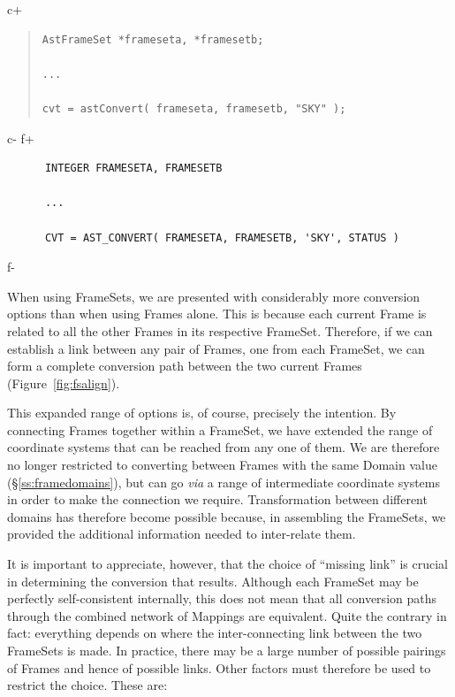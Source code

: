 \documentclass[twoside,11pt]{article}
\newcommand{\secref}[1]{\S\ref{#1}}
\newcommand{\secref}[1]{\ref{#1}}
\begin{document}
c+
\begin{quote}
\small
\begin{verbatim}
AstFrameSet *frameseta, *framesetb;

...

cvt = astConvert( frameseta, framesetb, "SKY" );
\end{verbatim}
\normalsize
\end{quote}
c-
f+
\small
\begin{verbatim}
      INTEGER FRAMESETA, FRAMESETB

      ...

      CVT = AST_CONVERT( FRAMESETA, FRAMESETB, 'SKY', STATUS )
\end{verbatim}
\normalsize
f-

When using FrameSets, we are presented with considerably more
conversion options than when using Frames alone. This is because each
current Frame is related to all the other Frames in its respective
FrameSet. Therefore, if we can establish a link between any pair of
Frames, one from each FrameSet, we can form a complete conversion path
between the two current Frames (Figure~\ref{fig:fsalign}).

This expanded range of options is, of course, precisely the
intention. By connecting Frames together within a FrameSet, we have
extended the range of coordinate systems that can be reached from any
one of them.  We are therefore no longer restricted to converting
between Frames with the same Domain value (\secref{ss:framedomains}),
but can go {\em{via}} a range of intermediate coordinate systems in
order to make the connection we require. Transformation between
different domains has therefore become possible because, in assembling
the FrameSets, we provided the additional information needed to
inter-relate them.

It is important to appreciate, however, that the choice of ``missing
link'' is crucial in determining the conversion that results.
Although each FrameSet may be perfectly self-consistent internally,
this does not mean that all conversion paths through the combined
network of Mappings are equivalent. Quite the contrary in fact:
everything depends on where the inter-connecting link between the two
FrameSets is made.  In practice, there may be a large number of
possible pairings of Frames and hence of possible links. Other factors
must therefore be used to restrict the choice. These are:
\end{document}
